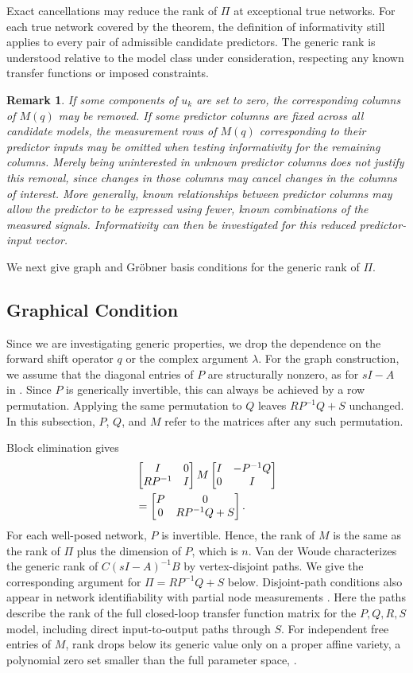 \documentclass[journal,twoside,web]{ieeecolor}
\newtheorem{remark}{Remark}
\begin{document}
%
Exact cancellations may reduce the rank of $\Pi$ at exceptional true networks.
For each true network covered by the theorem, the definition of informativity
still applies to every pair of admissible candidate predictors.
The generic rank is understood relative to the model class under consideration,
respecting any known transfer functions or imposed constraints.
%
\begin{remark}\label{rem:predictor-reduction}
If some components of $u_k$ are set to zero, the corresponding columns of
$M(q)$ may be removed. If some predictor columns are fixed across all candidate
models, the measurement rows of $M(q)$ corresponding to their predictor inputs
may be omitted when testing informativity for the remaining columns. Merely
being uninterested in unknown predictor columns does not justify this removal,
since changes in those columns may cancel changes in the columns of interest.
More generally, known relationships between predictor columns may allow the
predictor to be expressed using fewer, known combinations of the measured
signals. Informativity can then be investigated for this reduced predictor-input
vector.
\end{remark}
%
We next give graph and Gr\"obner basis conditions for the generic rank of $\Pi$.
%
\subsection{Graphical Condition}
%
Since we are investigating generic properties, we drop the dependence on
the forward shift operator $q$ or the complex argument $\lambda$.
For the graph construction, we assume that the diagonal entries of $P$ are
structurally nonzero, as for $sI-A$ in \cite{wou91}. Since $P$ is generically
invertible, this can always be achieved by a row permutation. Applying the same
permutation to $Q$ leaves $RP^{-1}Q+S$ unchanged. In this subsection, $P$, $Q$,
and $M$ refer to the matrices after any such permutation.

Block elimination gives
%
\begin{align*}
&\begin{bmatrix} I&0\\RP^{-1}&I\end{bmatrix} M\begin{bmatrix} I&-P^{-1}Q\\0&I\end{bmatrix}\\&=
\begin{bmatrix} P&0\\0& RP^{-1}Q+S\end{bmatrix}.
\end{align*}
%
For each well-posed network, $P$ is invertible.
Hence, the rank of $M$ is the same as the rank of $\Pi$ plus the dimension of
$P$, which is $n$.
Van der Woude \cite{wou91} characterizes the generic rank of
$C(sI-A)^{-1}B$ by vertex-disjoint paths. We give the corresponding
argument for $\Pi=RP^{-1}Q+S$ below. Disjoint-path conditions also appear
in network identifiability with partial node measurements
\cite{hen+gev+baz19}. Here the paths describe the rank of the full
closed-loop transfer function matrix for the $P,Q,R,S$ model, including
direct input-to-output paths through $S$. For independent free entries of $M$,
rank drops below its generic value only on a proper affine variety, a
polynomial zero set smaller than the full parameter space,
\cite{cox+lit+she92}.
\end{document}

